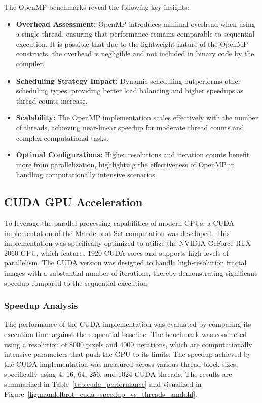 \documentclass[
	report, %
	11pt, %
]{CSUniSchoolLabReport}
\newcounter{ct}
\begin{document}
The OpenMP benchmarks reveal the following key insights:

\begin{itemize}
	\item \textbf{Overhead Assessment:} OpenMP introduces minimal overhead when using a single thread, ensuring that performance remains comparable to sequential execution. It is possible that due to the lightweight nature of the OpenMP constructs, the overhead is negligible and not included in binary code by the compiler.
	\item \textbf{Scheduling Strategy Impact:} Dynamic scheduling outperforms other scheduling types, providing better load balancing and higher speedups as thread counts increase.
	\item \textbf{Scalability:} The OpenMP implementation scales effectively with the number of threads, achieving near-linear speedup for moderate thread counts and complex computational tasks.
	\item \textbf{Optimal Configurations:} Higher resolutions and iteration counts benefit more from parallelization, highlighting the effectiveness of OpenMP in handling computationally intensive scenarios.
\end{itemize}

\subsection{CUDA GPU Acceleration}

To leverage the parallel processing capabilities of modern GPUs, a CUDA implementation of the Mandelbrot Set computation was developed. This implementation was specifically optimized to utilize the NVIDIA GeForce RTX 2060 GPU, which features 1920 CUDA cores and supports high levels of parallelism. The CUDA version was designed to handle high-resolution fractal images with a substantial number of iterations, thereby demonstrating significant speedup compared to the sequential execution.

\subsubsection{Speedup Analysis}

The performance of the CUDA implementation was evaluated by comparing its execution time against the sequential baseline. The benchmark was conducted using a resolution of 8000 pixels and 4000 iterations, which are computationally intensive parameters that push the GPU to its limits. The speedup achieved by the CUDA implementation was measured across various thread block sizes, specifically using 4, 16, 64, 256, and 1024 CUDA threads. The results are summarized in Table~\ref{tab:cuda_performance} and visualized in Figure~\ref{fig:mandelbrot_cuda_speedup_vs_threads_amdahl}.
\end{document}
